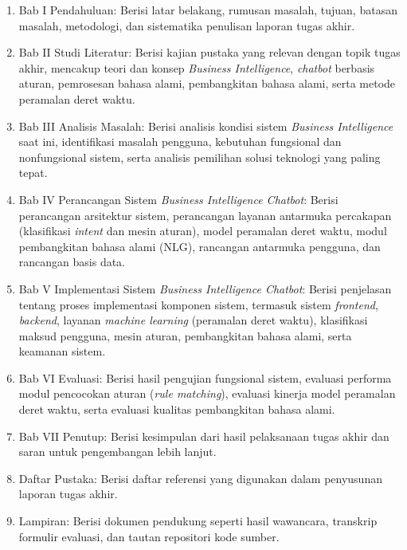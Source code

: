 \begin{enumerate}
  \item Bab I Pendahuluan: Berisi latar belakang, rumusan masalah, tujuan, batasan masalah, metodologi, dan sistematika penulisan laporan tugas akhir.
  \item Bab II Studi Literatur: Berisi kajian pustaka yang relevan dengan topik tugas akhir, mencakup teori dan konsep \textit{Business Intelligence}, \textit{chatbot} berbasis aturan, pemrosesan bahasa alami, pembangkitan bahasa alami, serta metode peramalan deret waktu.
  \item Bab III Analisis Masalah: Berisi analisis kondisi sistem \textit{Business Intelligence} saat ini, identifikasi masalah pengguna, kebutuhan fungsional dan nonfungsional sistem, serta analisis pemilihan solusi teknologi yang paling tepat.
  \item Bab IV Perancangan Sistem \textit{Business Intelligence Chatbot}: Berisi perancangan arsitektur sistem, perancangan layanan antarmuka percakapan (klasifikasi \textit{intent} dan mesin aturan), model peramalan deret waktu, modul pembangkitan bahasa alami (NLG), rancangan antarmuka pengguna, dan rancangan basis data.
  \item Bab V Implementasi Sistem \textit{Business Intelligence Chatbot}: Berisi penjelasan tentang proses implementasi komponen sistem, termasuk sistem \textit{frontend}, \textit{backend}, layanan \textit{machine learning} (peramalan deret waktu), klasifikasi maksud pengguna, mesin aturan, pembangkitan bahasa alami, serta keamanan sistem.
  \item Bab VI Evaluasi: Berisi hasil pengujian fungsional sistem, evaluasi performa modul pencocokan aturan (\textit{rule matching}), evaluasi kinerja model peramalan deret waktu, serta evaluasi kualitas pembangkitan bahasa alami.
  \item Bab VII Penutup: Berisi kesimpulan dari hasil pelaksanaan tugas akhir dan saran untuk pengembangan lebih lanjut.
  \item Daftar Pustaka: Berisi daftar referensi yang digunakan dalam penyusunan laporan tugas akhir.
  \item Lampiran: Berisi dokumen pendukung seperti hasil wawancara, transkrip formulir evaluasi, dan tautan repositori kode sumber.
\end{enumerate}



